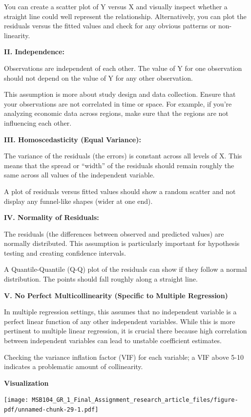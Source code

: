 \documentclass[
  a4paper,
  DIV=11,
  numbers=noendperiod]{scrartcl}
\begin{document}
You can create a scatter plot of Y versus X and visually inspect whether
a straight line could well represent the relationship. Alternatively,
you can plot the residuals versus the fitted values and check for any
obvious patterns or non-linearity.

\textbf{II. Independence:}

Observations are independent of each other. The value of Y for one
observation should not depend on the value of Y for any other
observation.

This assumption is more about study design and data collection. Ensure
that your observations are not correlated in time or space. For example,
if you're analyzing economic data across regions, make sure that the
regions are not influencing each other.

\textbf{III. Homoscedasticity (Equal Variance):}

The variance of the residuals (the errors) is constant across all levels
of X. This means that the spread or ``width'' of the residuals should
remain roughly the same across all values of the independent variable.

A plot of residuals versus fitted values should show a random scatter
and not display any funnel-like shapes (wider at one end).

\textbf{IV. Normality of Residuals:}

The residuals (the differences between observed and predicted values)
are normally distributed. This assumption is particularly important for
hypothesis testing and creating confidence intervals.

A Quantile-Quantile (Q-Q) plot of the residuals can show if they follow
a normal distribution. The points should fall roughly along a straight
line.

\textbf{V. No Perfect Multicollinearity (Specific to Multiple
Regression)}

In multiple regression settings, this assumes that no independent
variable is a perfect linear function of any other independent
variables. While this is more pertinent to multiple linear regression,
it is crucial there because high correlation between independent
variables can lead to unstable coefficient estimates.

Checking the variance inflation factor (VIF) for each variable; a VIF
above 5-10 indicates a problematic amount of collinearity.

\textbf{Visualization}

\texttt{[image: MSB104\_GR\_1\_Final\_Assignment\_research\_article\_files/figure-pdf/unnamed-chunk-29-1.pdf]}
\end{document}
